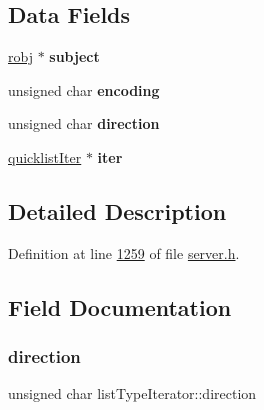 \subsection*{Data Fields}
\begin{DoxyCompactItemize}
\item 
\mbox{\label{structlistTypeIterator_a66eb5a4e71c1a5b13b55f1f0578a1cab}} 
\hyperlink{structredisObject}{robj} $\ast$ {\bfseries subject}
\item 
\mbox{\label{structlistTypeIterator_a296c8eeccc5d8fc68c8be9aa31f1582b}} 
unsigned char {\bfseries encoding}
\item 
\mbox{\label{structlistTypeIterator_aea8bd6557e011a36bcaf532e88c2a4ff}} 
unsigned char {\bfseries direction}
\item 
\mbox{\label{structlistTypeIterator_a82bd85b42db8ab505d7af9b544dc440a}} 
\hyperlink{structquicklistIter}{quicklist\+Iter} $\ast$ {\bfseries iter}
\end{DoxyCompactItemize}


\subsection{Detailed Description}


Definition at line \hyperlink{server_8h_source_l01259}{1259} of file \hyperlink{server_8h_source}{server.\+h}.



\subsection{Field Documentation}
\mbox{\label{structlistTypeIterator_aea8bd6557e011a36bcaf532e88c2a4ff}} 
\subsubsection{\texorpdfstring{direction}{direction}}
{\footnotesize\ttfamily unsigned char list\+Type\+Iterator\+::direction}



